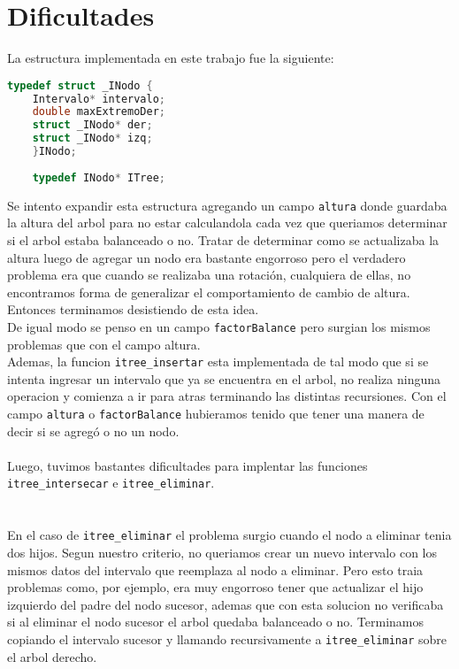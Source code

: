 \documentclass{article}
\begin{document}
	\section{Dificultades}
	La estructura implementada en este trabajo fue la siguiente: \\
	\begin{lstlisting}[language=C]
	typedef struct _INodo {
	Intervalo* intervalo;
	double maxExtremoDer;
	struct _INodo* der;
	struct _INodo* izq;
	}INodo;
	
	typedef INodo* ITree;
	\end{lstlisting}
	Se intento expandir esta estructura agregando un campo \verb|altura| donde guardaba la altura del arbol para no estar calculandola cada vez que queriamos determinar si el arbol estaba balanceado o no. Tratar de determinar como se actualizaba la altura luego de agregar un nodo era bastante engorroso pero el verdadero problema era que cuando se realizaba una rotación, cualquiera de ellas, no encontramos forma de generalizar el comportamiento de cambio de altura. Entonces terminamos desistiendo de esta idea. \\
	De igual modo se penso en un campo \verb|factorBalance| pero surgian los mismos problemas que con el campo altura.\\
	Ademas, la funcion \verb|itree_insertar| esta implementada de tal modo que si se intenta ingresar un intervalo que ya se encuentra en el arbol, no realiza ninguna operacion y comienza a ir para atras terminando las distintas recursiones. Con el campo \verb|altura| o \verb|factorBalance| hubieramos tenido que tener una manera de decir si se agregó o no un nodo.\\\\
	Luego, tuvimos bastantes dificultades para implentar las funciones \verb|itree_intersecar| e \verb|itree_eliminar|.\\\\\\
	En el caso de \verb|itree_eliminar| el problema surgio cuando el nodo a eliminar tenia dos hijos. Segun nuestro criterio, no queriamos crear un nuevo intervalo con los mismos datos del intervalo que reemplaza al nodo a eliminar. Pero esto traia problemas como, por ejemplo, era muy engorroso tener que actualizar el hijo izquierdo del padre del nodo sucesor, ademas que con esta solucion no verificaba si al eliminar el nodo sucesor el arbol quedaba balanceado o no. Terminamos copiando el intervalo sucesor y llamando recursivamente a \verb|itree_eliminar| sobre el arbol derecho.\\\\
\end{document}
